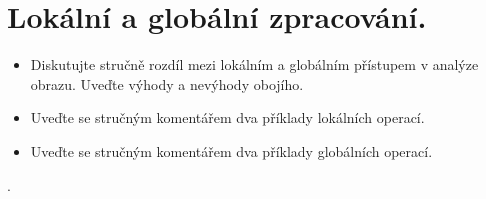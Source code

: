 \section{Lokální a globální zpracování.}
\begin{itemize}
    \item Diskutujte stručně rozdíl mezi lokálním a globálním přístupem v analýze obrazu. Uveďte výhody a nevýhody 
    obojího.
    \item Uveďte se stručným komentářem dva příklady lokálních operací.
    \item Uveďte se stručným komentářem dva příklady globálních operací.
\end{itemize}.